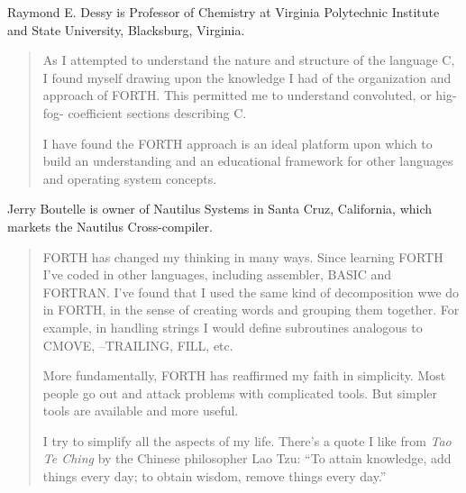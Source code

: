 Raymond E. Dessy is Professor of Chemistry at Virginia Polytechnic Institute
and State University, Blacksburg, Virginia.
\begin{quote}
As I attempted to understand the nature and structure of the language C, I 
found myself drawing upon the knowledge I had of the organization and
approach of FORTH.  This permitted me to understand convoluted, or hig-fog-
coefficient sections describing C.

I have found the FORTH approach is an ideal platform upon which to build
an understanding and an educational framework for other languages and
operating system concepts.
\end{quote}
Jerry Boutelle is owner of Nautilus Systems in Santa Cruz, California, 
which markets the Nautilus Cross-compiler.
\begin{quote}
FORTH has changed my thinking in many ways.  Since learning FORTH 
I've coded in other languages, including assembler, BASIC and FORTRAN.
I've found that I used the same kind of decomposition wwe do in
FORTH, in the sense of creating words and grouping them together.  For
example, in handling strings I would define subroutines analogous to
CMOVE, --TRAILING, FILL, etc.

More fundamentally, FORTH has reaffirmed my faith in simplicity.  Most 
people go out and attack problems with complicated tools.  But simpler
tools are available and more useful.

I try to simplify all the aspects of my life.  There's a quote I like from {\em Tao Te Ching}
by the Chinese philosopher Lao Tzu: ``To attain knowledge, add 
things every day; to obtain wisdom, remove things every day.''
\end{quote}
